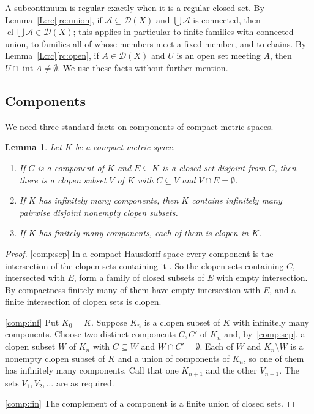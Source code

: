 \documentclass[11pt,reqno]{amsart}
\theoremstyle{plain}
\newtheorem{lemma}[theorem]{Lemma}
\theoremstyle{definition}
\theoremstyle{remark}
\newcommand{\D}{\mathcal{D}}
\newcommand{\cl}{\operatorname{cl}}
\newcommand{\intr}{\operatorname{int}}
\begin{document}
A subcontinuum is regular exactly when it is a regular closed set. By Lemma~\ref{L:rc}\ref{rc:union}, if $\mathcal A\subseteq\D(X)$ and $\bigcup\mathcal A$ is connected, then $\cl\bigcup\mathcal A\in\D(X)$; this applies in particular to finite families with connected union, to families all of whose members meet a fixed member, and to chains. By Lemma~\ref{L:rc}\ref{rc:open}, if $A\in\D(X)$ and $U$ is an open set meeting $A$, then $U\cap\intr A\neq\emptyset$. We use these facts without further mention.

\subsection{Components}
We need three standard facts on components of compact metric spaces.

\begin{lemma}\label{L:components}
Let $K$ be a compact metric space.
\begin{enumerate}[label=\textup{(\alph*)}]
\item\label{comp:sep} If $C$ is a component of $K$ and $E\subseteq K$ is a closed set disjoint from $C$, then there is a clopen subset $V$ of $K$ with $C\subseteq V$ and $V\cap E=\emptyset$.
\item\label{comp:inf} If $K$ has infinitely many components, then $K$ contains infinitely many pairwise disjoint nonempty clopen subsets.
\item\label{comp:fin} If $K$ has finitely many components, each of them is clopen in $K$.
\end{enumerate}
\end{lemma}

\begin{proof}
\ref{comp:sep} In a compact Hausdorff space every component is the intersection of the clopen sets containing it \cite[Theorem~6.1.23]{Engelking}. So the clopen sets containing $C$, intersected with $E$, form a family of closed subsets of $E$ with empty intersection. By compactness finitely many of them have empty intersection with $E$, and a finite intersection of clopen sets is clopen.

\ref{comp:inf} Put $K_0=K$. Suppose $K_{n}$ is a clopen subset of $K$ with infinitely many components. Choose two distinct components $C,C'$ of $K_n$ and, by~\ref{comp:sep}, a clopen subset $W$ of $K_n$ with $C\subseteq W$ and $W\cap C'=\emptyset$. Each of $W$ and $K_n\setminus W$ is a nonempty clopen subset of $K$ and a union of components of $K_n$, so one of them has infinitely many components. Call that one $K_{n+1}$ and the other $V_{n+1}$. The sets $V_1,V_2,\dots$ are as required.

\ref{comp:fin} The complement of a component is a finite union of closed sets.
\end{proof}
\end{document}
